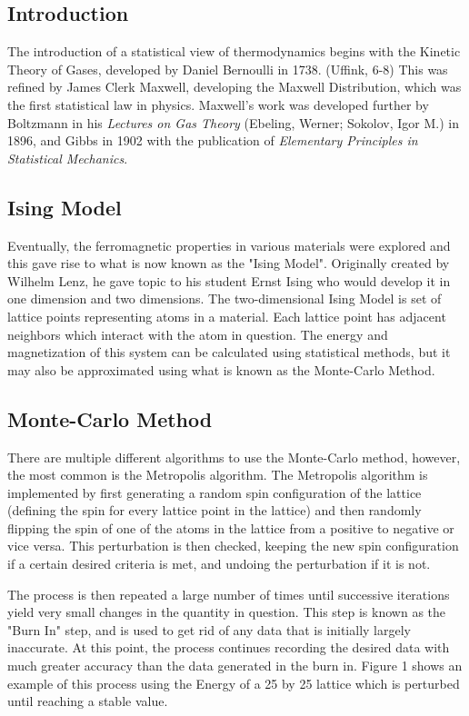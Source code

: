 \documentclass{article}
\begin{document}
\begin{multicols}{2}
\section{Introduction}
The introduction of a statistical view of thermodynamics begins with the Kinetic Theory of Gases, developed by Daniel Bernoulli in 1738. (Uffink, 6-8) This was refined by James Clerk Maxwell, developing the Maxwell Distribution, which was the first statistical law in physics. Maxwell's work was developed further by Boltzmann in his \textit{Lectures on Gas Theory} (Ebeling, Werner; Sokolov, Igor M.) in 1896, and Gibbs in 1902 with the publication of \textit{Elementary Principles in Statistical Mechanics}. 

\subsection{Ising Model}
Eventually, the ferromagnetic properties in various materials were explored and this gave rise to what is now known as the "Ising Model". Originally created by  Wilhelm Lenz, he gave topic to his student Ernst Ising who would develop it in one dimension and two dimensions. The two-dimensional Ising Model is set of lattice points representing atoms in a material. Each lattice point has adjacent neighbors which interact with the atom in question. The energy and magnetization of this system can be calculated using statistical methods, but it may also be approximated using what is known as the Monte-Carlo Method.

\subsection{Monte-Carlo Method}
There are multiple different algorithms to use the Monte-Carlo method, however, the most common is the Metropolis algorithm. The Metropolis algorithm is implemented by first generating a random spin configuration of the lattice (defining the spin for every lattice point in the lattice) and then randomly flipping the spin of one of the atoms in the lattice from a positive to negative or vice versa. This perturbation is then checked, keeping the new spin configuration if a certain desired criteria is met, and undoing the perturbation if it is not. 

The process is then repeated a large number of times until successive iterations yield very small changes in the quantity in question. This step is known as the "Burn In" step, and is used to get rid of any data that is initially largely inaccurate. At this point, the process continues recording the desired data with much greater accuracy than the data generated in the burn in. Figure 1 shows an example of this process using the Energy of a 25 by 25 lattice which is perturbed until reaching a stable value. 


\end{multicols}
\end{document}

